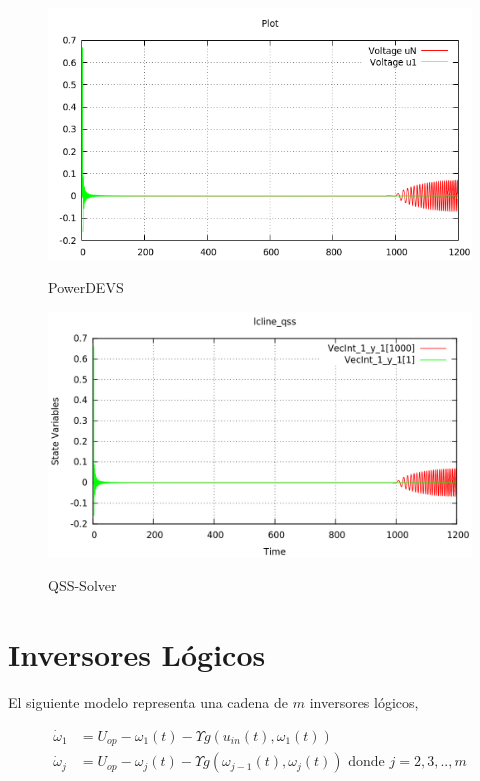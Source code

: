 \begin{figure}[H]
\centerfloat
\begin{minipage}{0.5\textwidth}
\includegraphics[width=\linewidth]{lcline-pd}
\label{graph:lclines-pd}
\caption{PowerDEVS}
\end{minipage}\hfill
\begin{minipage}{0.5\textwidth}
 \includegraphics[width=\linewidth]{lcline-qss}
\label{graph:lclines-qss}
\caption{QSS-Solver}
\end{minipage}
\end{figure}

\section{Inversores Lógicos}
	El siguiente modelo representa una cadena de $m$ inversores lógicos, 

\begin{align*}
\dot{\omega}_1 & = U_{op} - \omega_1(t) - \Upsilon g (u_{in}(t), \omega_{1} (t))    \\
\dot{\omega}_j & = U_{op} - \omega_j(t) - \Upsilon g (\omega_{j-1}(t), \omega_{j} (t)) \textrm{ donde $j = 2, 3, .., m$}
\end{align*}


